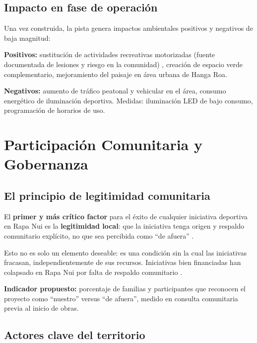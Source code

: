 \documentclass[12pt, a4paper]{article}
\begin{document}
\subsection{Impacto en fase de operación}

Una vez construida, la pista genera impactos ambientales positivos y negativos de
baja magnitud:

\textbf{Positivos:} sustitución de actividades recreativas motorizadas (fuente
documentada de lesiones y riesgo en la comunidad) \citep{ortega2026}, creación de
espacio verde complementario, mejoramiento del paisaje en área urbana de Hanga Roa.

\textbf{Negativos:} aumento de tráfico peatonal y vehicular en el área, consumo
energético de iluminación deportiva. Medidas: iluminación LED de bajo consumo,
programación de horarios de uso.

\section{Participación Comunitaria y Gobernanza}
\label{sec:gobernanza}

\subsection{El principio de legitimidad comunitaria}

El \textbf{primer y más crítico factor} para el éxito de cualquier iniciativa
deportiva en Rapa Nui es la \textbf{legitimidad local}: que la iniciativa tenga
origen y respaldo comunitario explícito, no que sea percibida como ``de afuera''
\citep{ortega2026}.

Esto no es solo un elemento deseable: es una condición sin la cual las iniciativas
fracasan, independientemente de sus recursos. Iniciativas bien financiadas han
colapsado en Rapa Nui por falta de respaldo comunitario \citep{ortega2026}.

\textbf{Indicador propuesto:} porcentaje de familias y participantes que reconocen
el proyecto como ``nuestro'' versus ``de afuera'', medido en consulta comunitaria
previa al inicio de obras.

\subsection{Actores clave del territorio}
\end{document}
